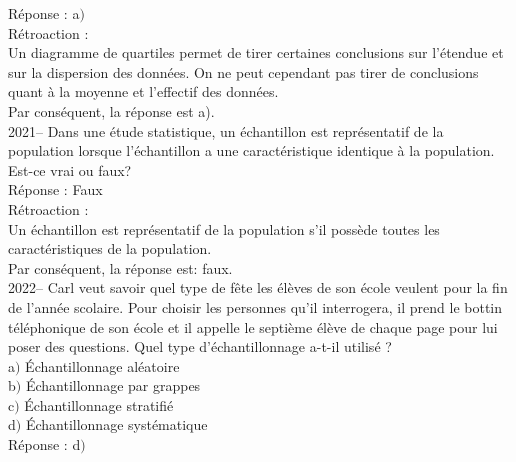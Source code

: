 \documentclass[letterpaper, 12pt]{article}
\begin{document}
R\'eponse : a$)$\\

R\'etroaction :\\
Un diagramme de quartiles permet de tirer certaines conclusions sur l'\'etendue et sur la dispersion des donn\'ees. On ne peut cependant pas tirer de conclusions quant \`a la moyenne et l'effectif des donn\'ees.\\
Par cons\'equent, la r\'eponse est a).\\

2021-- Dans une \'etude statistique, un \'echantillon est repr\'esentatif de la population lorsque l'\'echantillon a une caract\'eristique identique \`a la population. Est-ce vrai ou faux?\\

R\'eponse : Faux\\

R\'etroaction :\\
Un \'echantillon est repr\'esentatif de la population s'il poss\`ede toutes les caract\'eristiques de la population. \\
Par cons\'equent, la r\'eponse est: faux.\\


2022-- Carl veut savoir quel type de f\^ete les \'el\`eves de son \'ecole veulent pour la fin de l'ann\'ee scolaire. Pour choisir les personnes qu'il interrogera, il prend le bottin t\'el\'ephonique de son \'ecole et il appelle le septi\`eme \'el\`eve de chaque page pour lui poser des questions. Quel type d'\'echantillonnage a-t-il utilis\'e ?\\

a$)$ \'Echantillonnage al\'eatoire\\
b$)$ \'Echantillonnage par grappes\\
c$)$ \'Echantillonnage stratifi\'e\\
d$)$ \'Echantillonnage syst\'ematique\\

R\'eponse : d$)$\\
\end{document}
